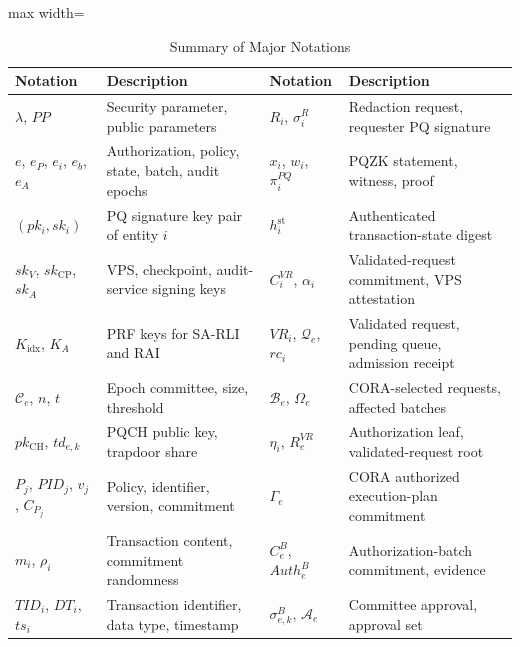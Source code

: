 \documentclass[lettersize,journal]{IEEEtran}
\begin{document}
\begin{table}[t]
\centering
\caption{Summary of Major Notations}
\label{tab:notation}
\scriptsize
\renewcommand{\arraystretch}{1.10}
\setlength{\tabcolsep}{3.8pt}
\begin{adjustbox}{max width=\textwidth}
\begin{tabular}{@{}ll@{\quad}ll@{}}
\hline
\textbf{Notation} & \textbf{Description} &
\textbf{Notation} & \textbf{Description}\\
\hline

$\lambda$, $PP$
& Security parameter, public parameters &
$R_i$, $\sigma_i^R$
& Redaction request, requester PQ signature\\

$e$, $e_P$, $e_i$, $e_b$, $e_A$
& Authorization, policy, state, batch, audit epochs &
$x_i$, $w_i$, $\pi_i^{PQ}$
& PQZK statement, witness, proof\\

$(pk_i,sk_i)$
& PQ signature key pair of entity $i$ &
$h_i^{\mathrm{st}}$
& Authenticated transaction-state digest\\

$sk_V$, $sk_{\mathrm{CP}}$, $sk_A$
& VPS, checkpoint, audit-service signing keys &
$C_i^{VR}$, $\alpha_i$
& Validated-request commitment, VPS attestation\\

$K_{\mathrm{idx}}$, $K_A$
& PRF keys for SA-RLI and RAI &
$VR_i$, $\mathcal{Q}_e$, $rc_i$
& Validated request, pending queue, admission receipt\\

$\mathcal{C}_e$, $n$, $t$
& Epoch committee, size, threshold &
$\mathcal{B}_e$, $\Omega_e$
& CORA-selected requests, affected batches\\

$pk_{\mathrm{CH}}$, $td_{e,k}$
& PQCH public key, trapdoor share &
$\eta_i$, $R_e^{VR}$
& Authorization leaf, validated-request root\\

$P_j$, $PID_j$, $v_j$, $C_{P_j}$
& Policy, identifier, version, commitment &
$\Gamma_e$
& CORA authorized execution-plan commitment\\

$m_i$, $\rho_i$
& Transaction content, commitment randomness &
$C_e^B$, $Auth_e^B$
& Authorization-batch commitment, evidence\\

$TID_i$, $DT_i$, $ts_i$
& Transaction identifier, data type, timestamp &
$\sigma_{e,k}^B$, $\mathcal{A}_e$
& Committee approval, approval set\\


\end{tabular}
\end{adjustbox}
\end{table}
\end{document}
